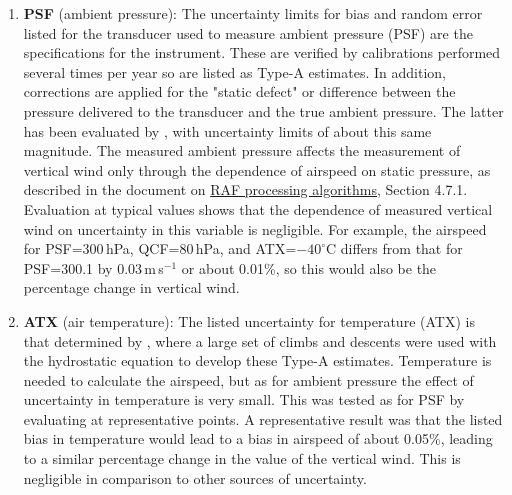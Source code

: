 \documentclass[12pt,twoside,english]{article}\usepackage[]{graphicx}\usepackage[]{color}
\let\OrgIndex\index
\renewcommand*{\index}[1]{\OrgIndex{#1}}
\begin{document}
{{\begin{enumerate}
The error in aircraft vertical speed is likely a mixture of bias and random error, because the primary source is uncertainty in ionospheric corrections which will be persistent for important parts of flights but likely to change at least from flight to flight. Because of the likely persistence of the error, it is assigned here primarily to bias.  
\item \textbf{PSF} (ambient pressure): The uncertainty limits for bias and random error listed for the transducer used to measure ambient pressure (PSF) are the specifications for the instrument. These are verified by calibrations performed several times per year so are listed as Type-A estimates. In addition, corrections are applied for the "static defect" or difference between the pressure delivered to the transducer and the true ambient pressure. The latter has been evaluated by \citet{CooperEtAl2014}, with uncertainty limits of about this same magnitude. The measured ambient pressure affects the measurement of vertical wind only through the dependence of airspeed on static pressure, as described in the document on \href{https://drive.google.com/file/d/0B1kIUH45ca5ATFV5d3QyQ0JpSjA/view?usp=sharing}{RAF processing algorithms}, Section 4.7.1. Evaluation at typical values shows that the dependence of measured vertical wind on uncertainty in this variable is negligible. For example, the airspeed for PSF=300\,hPa, QCF=80\,hPa, and ATX=$-40^{\circ}$C differs from that for PSF=300.1 by 0.03\,m\,s$^{-1}$ or about 0.01\%, so this would also be the percentage change in vertical wind.  
\item \textbf{ATX} (air temperature): The listed uncertainty for temperature (ATX) is that determined by \citet{CooperEtAl2014}, where a large set of climbs and descents were used with the hydrostatic equation to develop these Type-A estimates. Temperature is needed to calculate the airspeed, but as for ambient pressure the effect of uncertainty in temperature is very small. This was tested as for PSF by evaluating at representative points. A representative result was that the listed bias in temperature would lead to a bias in airspeed of about 0.05\%, leading to a similar percentage change in the value of the vertical wind. This is negligible in comparison to other sources of uncertainty.  
\end{enumerate}

}}
\end{document}
